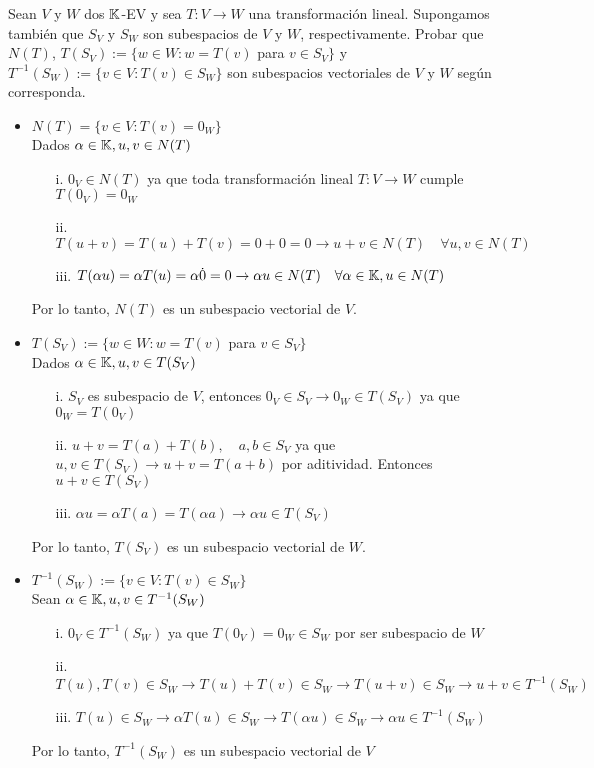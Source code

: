 \item Sean $V$ y $W$ dos $\mathbb{K}$-EV y sea $T:V\to W$ una transformación lineal. Supongamos también que $S_V$ y $S_W$ son subespacios de $V$ y $W$, respectivamente. Probar que $N(T)$, $T(S_V):=\{w\in W:w=T(v)$ para $v\in S_V\}$ y $T^{-1}(S_W):=\{v\in V:T(v)\in S_W\}$ son subespacios vectoriales de $V$ y $W$ según corresponda.
    \begin{mdframed}[style=s]
        \begin{itemize}
            \item $N(T)=\{v\in V:T(v)=0_W\}$\\
                Dados $\alpha\in\mathbb{K}, u,v\in N(T)$
                \begin{enumerate}
                    \item[i.]   $0_V\in N(T)$ ya que toda transformación lineal $T:V\to W$ cumple $T(0_V)=0_W$
                    \item[ii.]  $T(u+v)=T(u)+T(v)=0+0=0\to u+v\in N(T)\quad\forall u,v\in N(T)$
                    \item[iii.] $T(\alpha u)=\alpha T(u)=\alpha\dot0=0\to \alpha u\in N(T)\quad\forall \alpha\in\mathbb{K},u\in N(T)$
                \end{enumerate}
                Por lo tanto, $N(T)$ es un subespacio vectorial de $V$.
            \item $T(S_V):=\{w\in W:w=T(v)$ para $v\in S_V\}$\\
                Dados $\alpha\in\mathbb{K}, u,v\in T(S_V)$
                \begin{enumerate}
                    \item[i.] $S_V$ es subespacio de $V$, entonces $0_V\in S_V\to 0_W\in T(S_V)$ ya que $0_W=T(0_V)$
                    \item[ii.] $u+v=T(a)+T(b),\quad a,b\in S_V$ ya que $u,v\in T(S_V)\to u+v=T(a+b)$ por aditividad. Entonces $u+v\in T(S_V)$
                    \item[iii.] $\alpha u=\alpha T(a)=T(\alpha a)\to \alpha u\in T(S_V)$
                \end{enumerate}
                Por lo tanto, $T(S_V)$ es un subespacio vectorial de $W$.
            \item $T^{-1}(S_W):=\{v\in V:T(v)\in S_W\}$\\
                Sean $\alpha\in\mathbb{K},u,v\in T^{-1}(S_W)$
                \begin{enumerate}
                    \item[i.] $0_V\in T^{-1}(S_W)$ ya que $T(0_V)=0_W\in S_W$ por ser subespacio de $W$
                    \item[ii.] $T(u),T(v)\in S_W\to T(u)+T(v)\in S_W\to T(u+v)\in S_W\to u+v\in T^{-1}(S_W)$
                    \item[iii.] $T(u)\in S_W\to \alpha T(u)\in S_W\to T(\alpha u)\in S_W\to \alpha u\in T^{-1}(S_W)$ 
                \end{enumerate}
                Por lo tanto, $T^{-1}(S_W)$ es un subespacio vectorial de $V$
        \end{itemize}
    \end{mdframed}